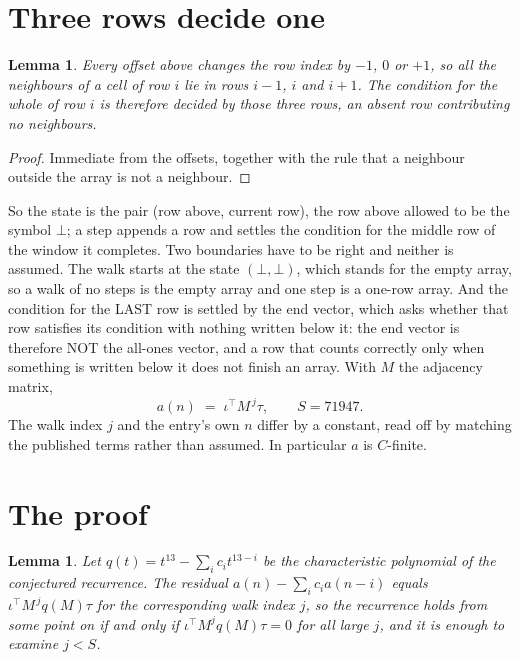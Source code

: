 \documentclass[11pt,a4paper]{article}
\theoremstyle{plain}
\newtheorem{lemma}[theorem]{Lemma}
\theoremstyle{definition}
\begin{document}
\section{Three rows decide one}

\begin{lemma}\label{lem:win}
Every offset above changes the row index by $-1$, $0$ or $+1$, so all the neighbours of a cell
of row $i$ lie in rows $i-1$, $i$ and $i+1$. The condition for the whole of row $i$ is
therefore decided by those three rows, an absent row contributing no neighbours.
\end{lemma}

\begin{proof}
Immediate from the offsets, together with the rule that a neighbour outside the array is not a
neighbour.
\end{proof}

So the state is the pair (row above, current row), the row above allowed to be the symbol
$\bot$; a step appends a row and settles the condition for the middle row of the window it
completes. Two boundaries have to be right and neither is assumed. The walk starts at the state
$(\bot,\bot)$, which stands for the empty array, so a walk of no steps is the empty array and
one step is a one-row array. And the condition for the LAST row is settled by the end vector,
which asks whether that row satisfies its condition with nothing written below it: the end
vector is therefore NOT the all-ones vector, and a row that counts correctly only when
something is written below it does not finish an array. With $M$ the adjacency matrix,
\[
a(n)\;=\;\iota^{\!\top}M^{\,j}\tau ,\qquad S=71947.
\]
The walk index $j$ and the entry's own $n$ differ by a constant, read off by matching the
published terms rather than assumed. In particular $a$ is $C$-finite.

\section{The proof}

\begin{lemma}\label{lem:crit}
Let $q(t)=t^{13}-\sum_i c_it^{13-i}$ be the characteristic polynomial of the
conjectured recurrence. The residual $a(n)-\sum_ic_ia(n-i)$ equals
$\iota^{\!\top}M^{\,j}q(M)\tau$ for the corresponding walk index $j$, so the recurrence
holds from some point on if and only if $\iota^{\!\top}M^{j}q(M)\tau=0$ for all large $j$,
and it is enough to examine $j<S$.
\end{lemma}
\end{document}
